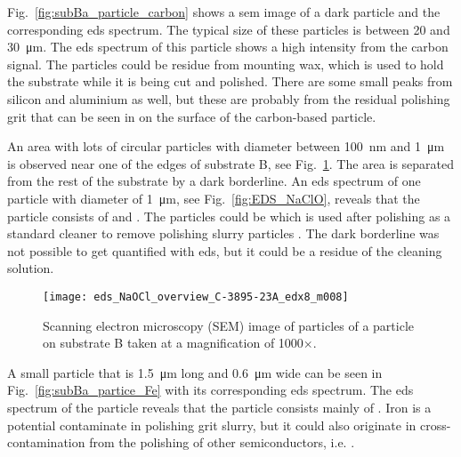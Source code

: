 Fig.~\ref{fig:subBa_particle_carbon} shows a \ac{sem} image of a dark particle and the corresponding \ac{eds} spectrum. The typical size of these particles is between \SI{20}{} and \SI{30}{\micro\metre}. The \ac{eds} spectrum of this particle shows a high intensity from the carbon signal. The particles could be residue from mounting wax, which is used to hold the substrate while it is being cut and polished. There are some small peaks from silicon and aluminium as well, but these are probably from the residual polishing grit that can be seen in on the surface of the carbon-based particle.

An area with lots of circular particles with diameter between \SI{100}{\nano\metre} and \SI{1}{\micro\metre} is observed near one of the edges of substrate B, see Fig.~\ref{fig:eds_NaOCl_overview}. The area is separated from the rest of the substrate by a dark borderline. An \ac{eds} spectrum of one particle with diameter of \SI{1}{\micro\metre}, see Fig.~\ref{fig:EDS_NaClO}, reveals that the particle consists of  and . The particles could be  which is used after polishing as a standard cleaner to remove polishing slurry particles \citep{benson2015as-received}. The dark borderline was not possible to get quantified with \ac{eds}, but it could be a residue of the cleaning solution.

\begin{figure}
    \centering
    \texttt{[image: eds\_NaOCl\_overview\_C-3895-23A\_edx8\_m008]}
    \caption[]{Scanning electron microscopy (SEM) image of particles of a particle on substrate B taken at a magnification of 1000$\times$.}
    \label{fig:eds_NaOCl_overview}
\end{figure}

A small particle that is \SI{1.5}{\micro\metre} long and \SI{0.6}{\micro\metre} wide can be seen in Fig.~\ref{fig:subBa_partice_Fe} with its corresponding \ac{eds} spectrum. The \ac{eds} spectrum of the particle reveals that the particle consists mainly of . Iron is a potential contaminate in polishing grit slurry, but it could also originate in cross-contamination from the polishing of other semiconductors, i.e.  \citep{benson2015as-received}.


